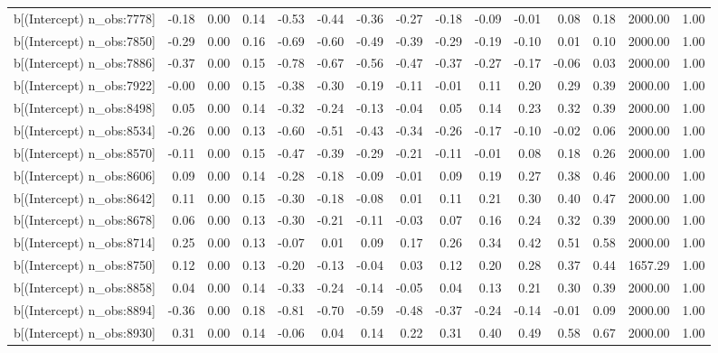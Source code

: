 \begin{table}[ht]
\begin{tabular}{rrrrrrrrrrrrrrr}
  b[(Intercept) n\_obs:7778] & -0.18 & 0.00 & 0.14 & -0.53 & -0.44 & -0.36 & -0.27 & -0.18 & -0.09 & -0.01 & 0.08 & 0.18 & 2000.00 & 1.00 \\ 
  b[(Intercept) n\_obs:7850] & -0.29 & 0.00 & 0.16 & -0.69 & -0.60 & -0.49 & -0.39 & -0.29 & -0.19 & -0.10 & 0.01 & 0.10 & 2000.00 & 1.00 \\ 
  b[(Intercept) n\_obs:7886] & -0.37 & 0.00 & 0.15 & -0.78 & -0.67 & -0.56 & -0.47 & -0.37 & -0.27 & -0.17 & -0.06 & 0.03 & 2000.00 & 1.00 \\ 
  b[(Intercept) n\_obs:7922] & -0.00 & 0.00 & 0.15 & -0.38 & -0.30 & -0.19 & -0.11 & -0.01 & 0.11 & 0.20 & 0.29 & 0.39 & 2000.00 & 1.00 \\ 
  b[(Intercept) n\_obs:8498] & 0.05 & 0.00 & 0.14 & -0.32 & -0.24 & -0.13 & -0.04 & 0.05 & 0.14 & 0.23 & 0.32 & 0.39 & 2000.00 & 1.00 \\ 
  b[(Intercept) n\_obs:8534] & -0.26 & 0.00 & 0.13 & -0.60 & -0.51 & -0.43 & -0.34 & -0.26 & -0.17 & -0.10 & -0.02 & 0.06 & 2000.00 & 1.00 \\ 
  b[(Intercept) n\_obs:8570] & -0.11 & 0.00 & 0.15 & -0.47 & -0.39 & -0.29 & -0.21 & -0.11 & -0.01 & 0.08 & 0.18 & 0.26 & 2000.00 & 1.00 \\ 
  b[(Intercept) n\_obs:8606] & 0.09 & 0.00 & 0.14 & -0.28 & -0.18 & -0.09 & -0.01 & 0.09 & 0.19 & 0.27 & 0.38 & 0.46 & 2000.00 & 1.00 \\ 
  b[(Intercept) n\_obs:8642] & 0.11 & 0.00 & 0.15 & -0.30 & -0.18 & -0.08 & 0.01 & 0.11 & 0.21 & 0.30 & 0.40 & 0.47 & 2000.00 & 1.00 \\ 
  b[(Intercept) n\_obs:8678] & 0.06 & 0.00 & 0.13 & -0.30 & -0.21 & -0.11 & -0.03 & 0.07 & 0.16 & 0.24 & 0.32 & 0.39 & 2000.00 & 1.00 \\ 
  b[(Intercept) n\_obs:8714] & 0.25 & 0.00 & 0.13 & -0.07 & 0.01 & 0.09 & 0.17 & 0.26 & 0.34 & 0.42 & 0.51 & 0.58 & 2000.00 & 1.00 \\ 
  b[(Intercept) n\_obs:8750] & 0.12 & 0.00 & 0.13 & -0.20 & -0.13 & -0.04 & 0.03 & 0.12 & 0.20 & 0.28 & 0.37 & 0.44 & 1657.29 & 1.00 \\ 
  b[(Intercept) n\_obs:8858] & 0.04 & 0.00 & 0.14 & -0.33 & -0.24 & -0.14 & -0.05 & 0.04 & 0.13 & 0.21 & 0.30 & 0.39 & 2000.00 & 1.00 \\ 
  b[(Intercept) n\_obs:8894] & -0.36 & 0.00 & 0.18 & -0.81 & -0.70 & -0.59 & -0.48 & -0.37 & -0.24 & -0.14 & -0.01 & 0.09 & 2000.00 & 1.00 \\ 
  b[(Intercept) n\_obs:8930] & 0.31 & 0.00 & 0.14 & -0.06 & 0.04 & 0.14 & 0.22 & 0.31 & 0.40 & 0.49 & 0.58 & 0.67 & 2000.00 & 1.00 \\ 

\end{tabular}
\end{table}
